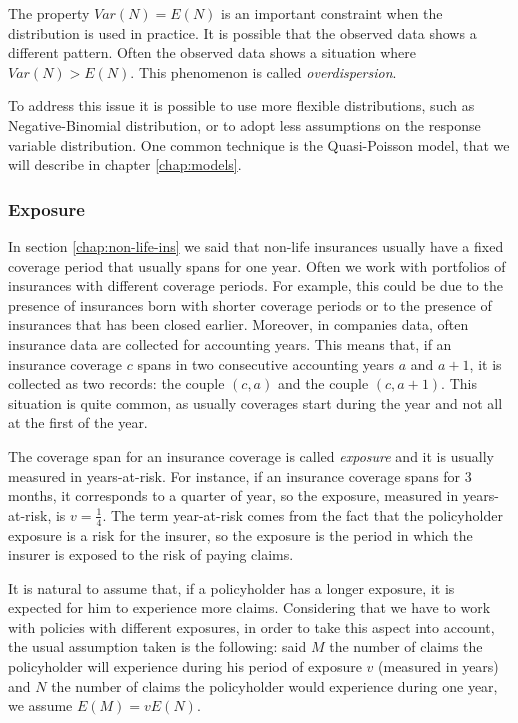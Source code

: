 \documentclass[a4paper, twoside, openright, 12pt]{report}
\theoremstyle{definition}
\theoremstyle{definition}
\theoremstyle{definition}
\theoremstyle{remark}
\begin{document}
The property \(Var(N) = E(N)\) is an important constraint when the distribution is used in practice. It is possible that the observed data shows a different pattern. Often the observed data shows a situation where \(Var(N) > E(N)\). This phenomenon is called \emph{overdispersion}.

To address this issue it is possible to use more flexible distributions, such as Negative-Binomial distribution, or to adopt less assumptions on the response variable distribution. One common technique is the Quasi-Poisson model, that we will describe in chapter \ref{chap:models}.

\hypertarget{chap:exposure}{%
\subsubsection{Exposure}\label{chap:exposure}}

In section \ref{chap:non-life-ins} we said that non-life insurances usually have a fixed coverage period that usually spans for one year. Often we work with portfolios of insurances with different coverage periods. For example, this could be due to the presence of insurances born with shorter coverage periods or to the presence of insurances that has been closed earlier. Moreover, in companies data, often insurance data are collected for accounting years. This means that, if an insurance coverage \(c\) spans in two consecutive accounting years \(a\) and \(a+1\), it is collected as two records: the couple \((c, a)\) and the couple \((c, a+1)\). This situation is quite common, as usually coverages start during the year and not all at the first of the year.

The coverage span for an insurance coverage is called \emph{exposure} and it is usually measured in years-at-risk. For instance, if an insurance coverage spans for 3 months, it corresponds to a quarter of year, so the exposure, measured in years-at-risk, is \(v=\frac{1}{4}\). The term year-at-risk comes from the fact that the policyholder exposure is a risk for the insurer, so the exposure is the period in which the insurer is exposed to the risk of paying claims.

It is natural to assume that, if a policyholder has a longer exposure, it is expected for him to experience more claims. Considering that we have to work with policies with different exposures, in order to take this aspect into account, the usual assumption taken is the following: said \(M\) the number of claims the policyholder will experience during his period of exposure \(v\) (measured in years) and \(N\) the number of claims the policyholder would experience during one year, we assume \(E(M) = v E(N)\).
\end{document}
